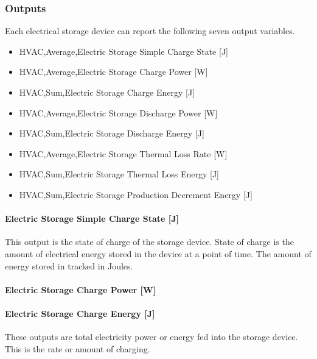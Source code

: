 \subsubsection{Outputs}\label{outputs-4-003}

Each electrical storage device can report the following seven output variables.

\begin{itemize}
\item
  HVAC,Average,Electric Storage Simple Charge State {[}J{]}
\item
  HVAC,Average,Electric Storage Charge Power {[}W{]}
\item
  HVAC,Sum,Electric Storage Charge Energy {[}J{]}
\item
  HVAC,Average,Electric Storage Discharge Power {[}W{]}
\item
  HVAC,Sum,Electric Storage Discharge Energy {[}J{]}
\item
  HVAC,Average,Electric Storage Thermal Loss Rate {[}W{]}
\item
  HVAC,Sum,Electric Storage Thermal Loss Energy {[}J{]}
\item
  HVAC,Sum,Electric Storage Production Decrement Energy {[}J{]}
\end{itemize}

\paragraph{Electric Storage Simple Charge State {[}J{]}}\label{electric-storage-simple-charge-state-j}

This output is the state of charge of the storage device. State of charge is the amount of electrical energy stored in the device at a point of time. The amount of energy stored in tracked in Joules.

\paragraph{Electric Storage Charge Power {[}W{]}}\label{electric-storage-charge-power-w}

\paragraph{Electric Storage Charge Energy {[}J{]}}\label{electric-storage-charge-energy-j}

These outputs are total electricity power or energy fed into the storage device. This is the rate or amount of charging.

